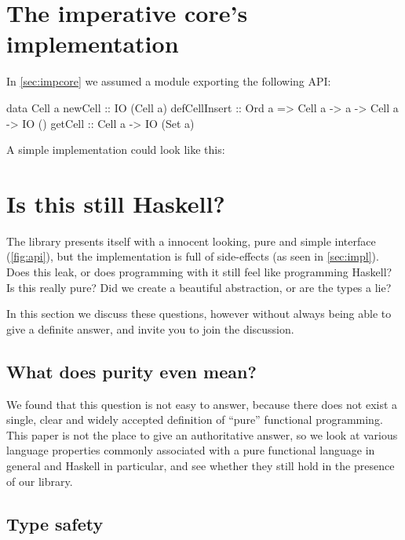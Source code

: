 \documentclass[manuscript,review,screen,acmsmall]{acmart}
\newif\ifpure
\begin{document}

\section{The imperative core's implementation}\label{sec:impcoreimpl}

In \cref{sec:impcore} we assumed a module exporting the following API:
\begin{code}
data Cell a
newCell        ::                                      IO (Cell a)
defCellInsert  ::  Ord a =>  Cell a -> a -> Cell a ->  IO ()
getCell        ::            Cell a ->                 IO (Set a)
\end{code}

\noindent 
A simple implementation could look like this:



\ifpure
\section{Is this still Haskell?}\label{sec:pure}

The library presents itself with a innocent looking, pure and simple interface (\cref{fig:api}), but the implementation is full of side-effects (as seen in \cref{sec:impl}).
Does this leak, or does programming with it still feel like programming Haskell?
Is this really pure? Did we create a beautiful abstraction, or are the types a lie?

In this section we discuss these questions, however without always being able to give a definite answer, and invite you to join the discussion.

\subsection{What does purity even mean?}

We found that this question is not easy to answer, because there does not exist a single, clear and widely accepted definition of “pure” functional programming.
This paper is not the place to give an authoritative answer, so we look at various language properties commonly associated with a pure functional language in general and Haskell in particular,
and see whether they still hold in the presence of our library.

\subsection{Type safety}
\end{document}
